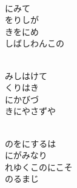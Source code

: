 \documentclass[10pt,b5j]{tarticle} %
\begin{document}
\vspace{1.5em} %
\newcommand{\linespace}{0.5em} %
\newcommand{\blocksize}{0.5\hsize} %
\newcommand{\itemmargin}{3em} %
\begin{enumerate} %
    \setlength{\itemindent}{\itemmargin} %
    \begin{minipage}[c]{\blocksize}
    
        \vspace{\linespace}
        \item~\\
        にみて\\
        をりしが\\
        きをにめ\\
        しばしわんこの
        
    \end{minipage}
    \begin{minipage}[c]{\blocksize}
        
        \vspace{\linespace}
        \item~\\
        みしはけて\\
        くりはき\\
        にかびづ\\
        きにやさずや
        
    \end{minipage}
    \begin{minipage}[c]{\blocksize}
        
        \vspace{\linespace}
        \item~\\
        のをにするは\\
        にがみなり\\
        れゆくこのにこそ\\
        のるまじ
    
    \end{minipage}
\end{enumerate} %
\end{document}
